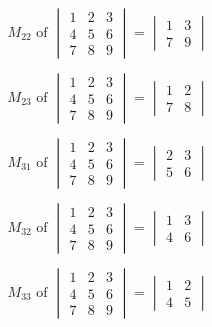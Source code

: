 \documentclass[11pt]{article}
\begin{document}
\begin{displaymath}
M_{22} \text{ of }
\begin{vmatrix}
1 & 2 & 3 \\
4 & 5 & 6 \\
7 & 8 & 9
\end{vmatrix} = \begin{vmatrix}
1 & 3 \\
7 & 9
\end{vmatrix}
\end{displaymath}

\begin{displaymath}
M_{23} \text{ of }
\begin{vmatrix}
1 & 2 & 3 \\
4 & 5 & 6 \\
7 & 8 & 9
\end{vmatrix} = \begin{vmatrix}
1 & 2 \\
7 & 8
\end{vmatrix}
\end{displaymath}

\begin{displaymath}
M_{31} \text{ of }
\begin{vmatrix}
1 & 2 & 3 \\
4 & 5 & 6 \\
7 & 8 & 9
\end{vmatrix} = \begin{vmatrix}
2 & 3 \\
5 & 6
\end{vmatrix}
\end{displaymath}

\begin{displaymath}
M_{32} \text{ of }
\begin{vmatrix}
1 & 2 & 3 \\
4 & 5 & 6 \\
7 & 8 & 9
\end{vmatrix} = \begin{vmatrix}
1 & 3 \\
4 & 6
\end{vmatrix}
\end{displaymath}

\begin{displaymath}
M_{33} \text{ of }
\begin{vmatrix}
1 & 2 & 3 \\
4 & 5 & 6 \\
7 & 8 & 9
\end{vmatrix} = \begin{vmatrix}
1 & 2 \\
4 & 5
\end{vmatrix}
\end{displaymath}
\end{document}
